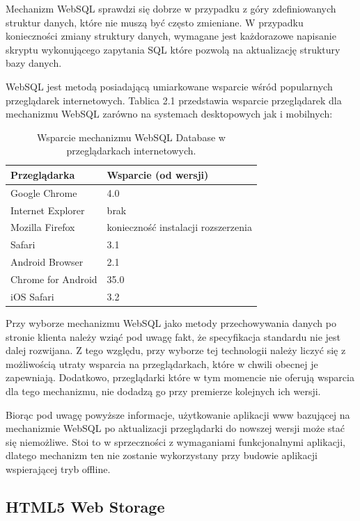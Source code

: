 Mechanizm WebSQL sprawdzi się dobrze w przypadku z góry zdefiniowanych struktur danych, które nie muszą być często zmieniane. W przypadku konieczności zmiany struktury danych, wymagane jest każdorazowe napisanie skryptu wykonującego zapytania SQL które pozwolą na aktualizację struktury bazy danych.

WebSQL jest metodą posiadającą umiarkowane wsparcie wśród popularnych przeglądarek internetowych. Tablica 2.1 przedstawia wsparcie przeglądarek dla mechanizmu WebSQL zarówno na systemach desktopowych jak i mobilnych:

\begin{table}[h]
\centering
    \begin{tabular}{ | p{8cm} | p{6cm} | }
    \hline
    \textbf{Przeglądarka} & \textbf{Wsparcie (od wersji)} \\ \hline
	Google Chrome & 4.0
	\\ \hline
	Internet Explorer & brak
	\\ \hline
	Mozilla Firefox & konieczność instalacji rozszerzenia
	\\ \hline
	Safari & 3.1
	\\ \hline
	Android Browser & 2.1
	\\ \hline
	Chrome for Android & 35.0
	\\ \hline
	iOS Safari & 3.2
	\\ \hline
    \end{tabular}
	\caption{Wsparcie mechanizmu WebSQL Database w przeglądarkach internetowych.}
\end{table}

Przy wyborze mechanizmu WebSQL jako metody przechowywania danych po stronie klienta należy wziąć pod uwagę fakt, że specyfikacja standardu nie jest dalej rozwijana. Z tego względu, przy wyborze tej technologii należy liczyć się z możliwością utraty wsparcia na przeglądarkach, które w chwili obecnej je zapewniają. Dodatkowo, przeglądarki które w tym momencie nie oferują wsparcia dla tego mechanizmu, nie dodadzą go przy premierze kolejnych ich wersji.

Biorąc pod uwagę powyższe informacje, użytkowanie aplikacji www bazującej na mechanizmie \mbox{WebSQL} po aktualizacji przeglądarki do nowszej wersji może stać się niemożliwe. Stoi to w sprzeczności z wymaganiami funkcjonalnymi aplikacji, dlatego mechanizm ten nie zostanie wykorzystany przy budowie aplikacji wspierającej tryb offline.

\subsection{HTML5 Web Storage}
\label{sec:html5WebStorage}

